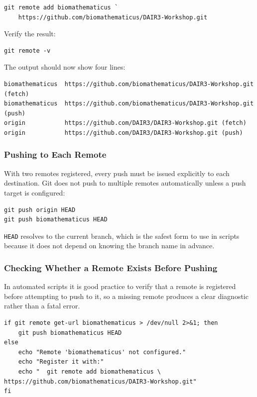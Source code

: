 \begin{lstlisting}[style=psstyle, caption={Register a personal mirror remote (PowerShell)}]
git remote add biomathematicus `
    https://github.com/biomathematicus/DAIR3-Workshop.git
\end{lstlisting}

Verify the result:

\begin{lstlisting}[style=bashstyle]
git remote -v
\end{lstlisting}

The output should now show four lines:

\begin{lstlisting}[style=inlineStyle]
biomathematicus  https://github.com/biomathematicus/DAIR3-Workshop.git (fetch)
biomathematicus  https://github.com/biomathematicus/DAIR3-Workshop.git (push)
origin           https://github.com/DAIR3/DAIR3-Workshop.git (fetch)
origin           https://github.com/DAIR3/DAIR3-Workshop.git (push)
\end{lstlisting}

\subsubsection{Pushing to Each Remote}

With two remotes registered, every push must be issued explicitly to
each destination. Git does not push to multiple remotes automatically
unless a push target is configured:

\begin{lstlisting}[style=bashstyle, caption={Push to both remotes explicitly}]
git push origin HEAD
git push biomathematicus HEAD
\end{lstlisting}

\texttt{HEAD} resolves to the current branch, which is the safest form
to use in scripts because it does not depend on knowing the branch name
in advance.

\subsubsection{Checking Whether a Remote Exists Before Pushing}

In automated scripts it is good practice to verify that a remote is
registered before attempting to push to it, so a missing remote produces
a clear diagnostic rather than a fatal error.

\begin{lstlisting}[style=bashstyle, caption={Guard a push with a remote existence check (bash)}]
if git remote get-url biomathematicus > /dev/null 2>&1; then
    git push biomathematicus HEAD
else
    echo "Remote 'biomathematicus' not configured."
    echo "Register it with:"
    echo "  git remote add biomathematicus \
https://github.com/biomathematicus/DAIR3-Workshop.git"
fi
\end{lstlisting}

